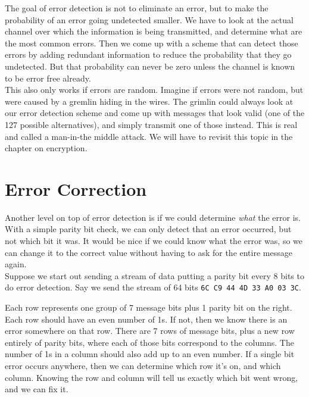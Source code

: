The goal of error detection is not to eliminate an error, but to make the probability of an error going undetected smaller. We have to look at the actual channel over which the information is being transmitted, and determine what are the most common errors. Then we come up with a scheme that can detect those errors by adding redundant information to reduce the probability that they go undetected. But that probability can never be zero unless the channel is known to be error free already.\\

This also only works if errors are random. Imagine if errors were not random, but were caused by a gremlin hiding in the wires. The grimlin could always look at our error detection scheme and come up with messages that look valid (one of the 127 possible alternatives), and simply transmit one of those instead. This is real and called a man-in-the middle attack. We will have to revisit this topic in the chapter on encryption.

\section{Error Correction}


Another level on top of error detection is if we could determine \textit{what} the error is. With a simple parity bit check, we can only detect that an error occurred, but not which bit it was. It would be nice if we could know what the error was, so we can change it to the correct value without having to ask for the entire message again.\\

Suppose we start out sending a stream of data putting a parity bit every 8 bits to do error detection. Say we send the stream of 64 bits \texttt{6C C9 44 4D 33 A0 03 3C}.\\

\begin{center}\end{center}

Each row represents one group of 7 message bits plus 1 parity bit on the right. Each row should have an even number of 1s. If not, then we know there is an error somewhere on that row. There are 7 rows of message bits, plus a new row entirely of parity bits, where each of those bits correspond to the columns. The number of 1s in a column should also add up to an even number. If a single bit error occurs anywhere, then we can determine which row it's on, and which column. Knowing the row and column will tell us exactly which bit went wrong, and we can fix it.\\

